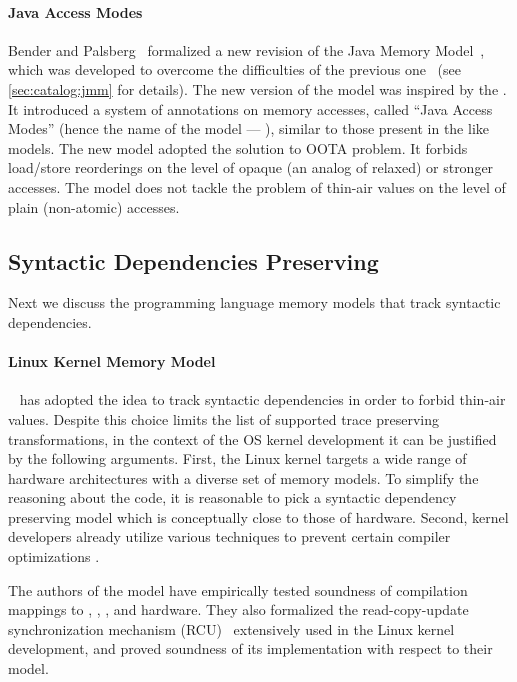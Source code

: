 \paragraph{Java Access Modes}

Bender and Palsberg~\cite{Bender-Palsberg:OOPSLA19} formalized a new revision 
of the Java Memory Model~\cite{JDK9-VarHandle, JEP:193, JDK9-Modes}, 
which was developed to overcome 
the difficulties of the previous one~\cite{Manson-al:POPL05}
(see \ref{sec:catalog:jmm} for details).
The new version of the model was inspired by the \RCMM. 
It introduced a system of annotations on memory accesses, 
called ``Java Access Modes'' (hence the name of the model --- \JAM),
similar to those present in the \CMM like models.
The new model adopted the \RCMM solution to OOTA problem. 
It forbids load/store reorderings on the level of 
opaque (an analog of \CPP relaxed) or stronger accesses.
The model does not tackle the problem of 
thin-air values on the level of plain (\ie non-atomic) accesses.

\subsection{Syntactic Dependencies Preserving}
\label{sec:catalog:deprf}

Next we discuss the programming language memory models 
that track syntactic dependencies.

\paragraph{Linux Kernel Memory Model}

\LKMM~\cite{Alglave-al:ASPLOS18} has adopted 
the idea to track syntactic dependencies in order to 
forbid thin-air values. Despite this choice 
limits the list of supported trace preserving transformations,
in the context of the OS kernel development 
it can be justified by the following arguments. 
First, the Linux kernel targets 
a wide range of hardware architectures with a diverse
set of memory models. To simplify the reasoning about the code, 
it is reasonable to pick a syntactic dependency preserving
model which is conceptually close to those of hardware. 
Second, kernel developers already utilize 
various techniques to prevent certain compiler optimizations%
\cite{Alglave-al:ASPLOS18, LK-MemBarriers, LK-RCU-Deref}.

The authors of the model have empirically tested 
soundness of compilation mappings to 
\Intel, , , and \POWER hardware. 
They also formalized the read-copy-update 
synchronization mechanism (RCU)~\cite{McKenney-RCU2007} 
extensively used in the Linux kernel development, 
and proved soundness of its implementation with respect to their model.

